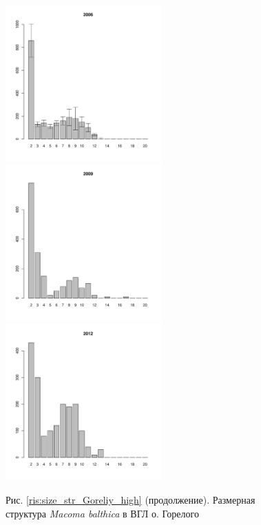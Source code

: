 \begin{figure}[hp]
\begin{minipage}[b]{.3\linewidth}
\begin{center}
	\end{center}
	\end{minipage}
	\begin{minipage}[b]{.3\linewidth}
	\begin{center}
	\includegraphics[width=60mm]{../White_Sea/Luvenga_Goreliy/high2_2006_.pdf}
	\end{center}
	\end{minipage}
	\hfill
	\begin{minipage}[b]{.3\linewidth}
	\begin{center}
	\includegraphics[width=60mm]{../White_Sea/Luvenga_Goreliy/high2_2009_.pdf}
	\end{center}
	\end{minipage}
	\hfill
	\begin{minipage}[b]{.3\linewidth}
	\begin{center}
	\includegraphics[width=60mm]{../White_Sea/Luvenga_Goreliy/high2_2012_.pdf}
	\end{center}
	\end{minipage}
	\begin{center}
	Рис. \ref{ris:size_str_Goreliy_high} (продолжение). Размерная структура {\it Macoma balthica} в ВГЛ о. Горелого
	\end{center}
	\end{figure}


